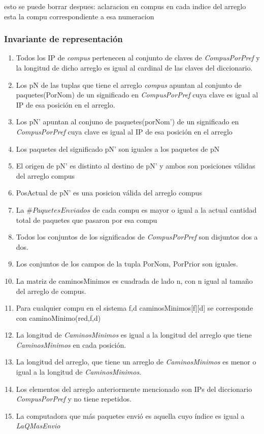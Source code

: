esto se puede borrar despues:
aclaracion en compus en cada indice del arreglo esta la compu correspondiente a esa numeracion

\subsubsection*{Invariante de representación}

\begin{enumerate}
  \item Todos los IP de \textit{compus} pertenecen al conjunto de claves de \textit{CompusPorPref} y la longitud de dicho arreglo 
		es igual al cardinal de las claves del diccionario. 
  \item Los pN de las tuplas que tiene el arreglo \textit{compus} apuntan al conjunto de paquetes(PorNom) 
		de un significado en \textit{CompusPorPref} cuya clave es igual al IP de esa posición en el arreglo.
  \item Los pN' apuntan al conjuno de paquetes(porNom') de un significado en \textit{CompusPorPref} cuya clave es igual al IP 
		de esa posición en el arreglo
  \item Los paquetes del significado pN' son iguales a los paquetes de pN
  \item El origen de pN' es distinto al destino de pN' y ambos son posiciones válidas del arreglo compus
  \item PosActual de pN' es una posicion válida del arreglo compus
  \item La $\#PaquetesEnviados$ de cada compu es mayor o igual a la actual cantidad total de paquetes que pasaron por esa compu
  \item Todos los conjuntos de los significados de \textit{CompusPorPref} son disjuntos dos a dos.
  \item Los conjuntos de los campos de la tupla PorNom, PorPrior son iguales.
  \item La matriz de caminosMinimos es cuadrada de lado n, con n igual al tamaño del arreglo de compus.
  \item Para cualquier compu en el sistema f,d caminosMinimos[f][d] se corresponde con caminoMinimo(red,f,d)
  \item La longitud de \textit{CaminosMinimos} es igual a la longitud del arreglo que tiene \textit{CaminosMinimos} en cada posición.
  \item La longitud del arreglo, que tiene un arreglo de \textit{CaminosMinimos} es menor o igual a la longitud de \textit{CaminosMinimos}.
  \item Los elementos del arreglo anteriormente mencionado son IPs del diccionario \textit{CompusPorPref} y no tiene repetidos.
  \item La computadora que más paquetes envió es aquella cuyo índice es igual a \textit{LaQMasEnvio}
\end{enumerate}

